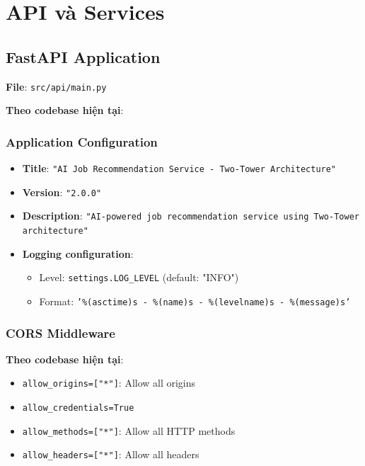 \section{API và Services}


\subsection{FastAPI Application}

\textbf{File}: \texttt{src/api/main.py}

\textbf{Theo codebase hiện tại}:

\subsubsection{Application Configuration}

\begin{itemize}
    \item \textbf{Title}: \texttt{"AI Job Recommendation Service - Two-Tower Architecture"}
    \item \textbf{Version}: \texttt{"2.0.0"}
    \item \textbf{Description}: \texttt{"AI-powered job recommendation service using Two-Tower architecture"}
    \item \textbf{Logging configuration}:
    \begin{itemize}
        \item Level: \texttt{settings.LOG\_LEVEL} (default: "INFO")
        \item Format: \texttt{'\%(asctime)s - \%(name)s - \%(levelname)s - \%(message)s'}
    \end{itemize}
\end{itemize}

\subsubsection{CORS Middleware}

\textbf{Theo codebase hiện tại}:

\begin{itemize}
    \item \texttt{allow\_origins=["*"]}: Allow all origins
    \item \texttt{allow\_credentials=True}
    \item \texttt{allow\_methods=["*"]}: Allow all HTTP methods
    \item \texttt{allow\_headers=["*"]}: Allow all headers
\end{itemize}

